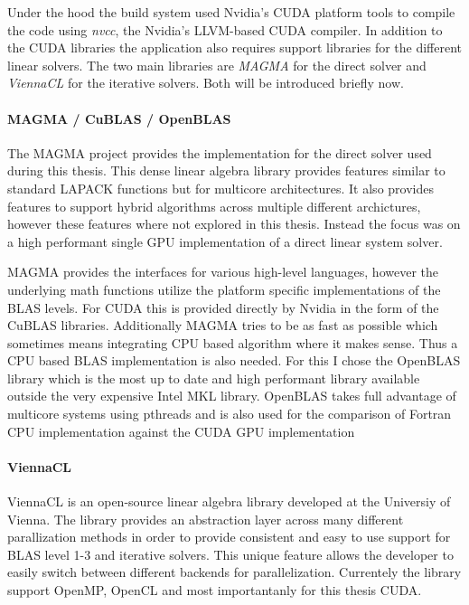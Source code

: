 \documentclass[a4paper,11pt]{kth-mag}
\begin{document}
Under the hood the build system used Nvidia's CUDA platform tools to compile the code using \emph{nvcc}, the Nvidia's LLVM-based CUDA compiler. In addition to the CUDA libraries the application also requires support libraries for the different linear solvers. The two main libraries are \emph{MAGMA} for the direct solver and \emph{ViennaCL} for the iterative solvers. Both will be introduced briefly now.

\paragraph{MAGMA / CuBLAS / OpenBLAS}
The MAGMA project provides the implementation for the direct solver used during this thesis. This dense linear algebra library provides features similar to standard LAPACK functions but for multicore architectures. It also provides features to support hybrid algorithms across multiple different archictures, however these features where not explored in this thesis. Instead the focus was on a high performant single GPU implementation of a direct linear system solver.

MAGMA provides the interfaces for various high-level languages, however the underlying math functions utilize the platform specific implementations of the BLAS levels. For CUDA this is provided directly by Nvidia in the form of the CuBLAS libraries. Additionally MAGMA tries to be as fast as possible which sometimes means integrating CPU based algorithm where it makes sense. Thus a CPU based BLAS implementation is also needed. For this I chose the OpenBLAS library which is the most up to date and high performant library available outside the very expensive Intel MKL library. OpenBLAS takes full advantage of multicore systems using pthreads and is also used for the comparison of Fortran CPU implementation against the CUDA GPU implementation

\paragraph{ViennaCL}
ViennaCL is an open-source linear algebra library developed at the Universiy of Vienna. The library provides an abstraction layer across many different parallization methods in order to provide consistent and easy to use support for BLAS level 1-3 and iterative solvers. This unique feature allows the developer to easily switch between different backends for parallelization. Currentely the library support OpenMP, OpenCL and most importantanly for this thesis CUDA.
\end{document}
